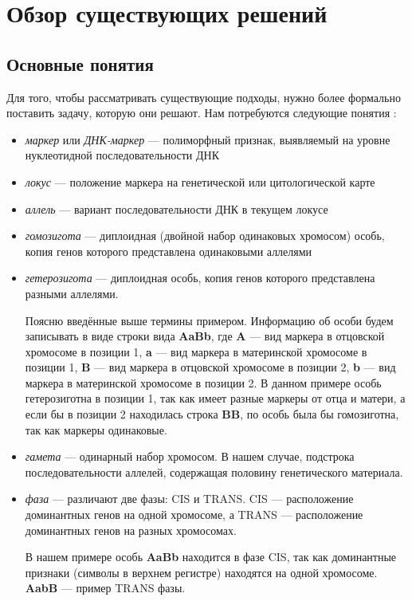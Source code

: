 \documentclass{matmex-diploma-custom}
\begin{document}
\section{Обзор существующих решений}

\subsection*{Основные понятия}

Для того, чтобы рассматривать существующие подходы, нужно более
формально поставить задачу, которую они решают. Нам
потребуются следующие понятия \cite{dictionary}:
\begin{itemize}
\item \emph{маркер} или \emph{ДНК-маркер} --- полиморфный признак,
  выявляемый на уровне нуклеотидной последовательности ДНК
\item \emph{локус} --- положение маркера на генетической или
  цитологической карте
\item \emph{аллель} --- вариант последовательности ДНК в текущем локусе
\item \emph{гомозигота} --- диплоидная (двойной набор одинаковых
  хромосом) особь, копия генов которого представлена одинаковыми
  аллелями
\item \emph{гетерозигота} --- диплоидная особь, копия генов которого
  представлена разными аллелями.

  Поясню введённые выше термины примером. Информацию об особи будем
  записывать в виде строки вида \textbf{AaBb}, где \textbf{A} --- вид
  маркера в отцовской хромосоме в позиции 1, \textbf{a} --- вид
  маркера в материнской хромосоме в позиции 1, \textbf{B} --- вид
  маркера в отцовской хромосоме в позиции 2, \textbf{b} --- вид
  маркера в материнской хромосоме в позиции 2. В данном примере особь
  гетерозиготна в позиции 1, так как имеет разные маркеры от отца и
  матери, а если бы в позиции 2 находилась строка \textbf{BB}, по
  особь была бы гомозиготна, так как маркеры одинаковые.

\item \emph{гамета} --- одинарный набор хромосом. В нашем случае,
  подстрока последовательности аллелей, содержащая половину
  генетического материала.

\item \emph{фаза} --- различают две фазы: CIS и TRANS. CIS --- расположение
  доминантных генов на одной хромосоме, а TRANS --- расположение
  доминантных генов на разных хромосомах.

В нашем примере особь \textbf{AaBb} находится в фазе CIS, так как
доминантные признаки (символы в верхнем регистре) находятся на одной
хромосоме. \textbf{AabB} --- пример TRANS фазы.



\end{itemize}
\end{document}
